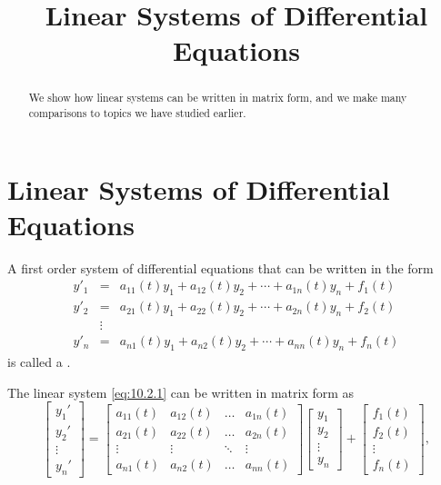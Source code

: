 \documentclass{ximera}
\title{Linear Systems of Differential Equations}%
\begin{document}
\begin{abstract}
We show how linear systems can be written in matrix form, and we make many comparisons to topics we have studied earlier.
\end{abstract}

\maketitle

\section*{Linear Systems of Differential Equations}

A  first order system of  differential equations that can be written in
the form
\begin{equation} \label{eq:10.2.1}
\begin{array}{ccl}
y'_1&=&a_{11}(t)y_1+a_{12}(t)y_2+\cdots+a_{1n}(t)y_n+f_1(t)\\
y'_2&=&a_{21}(t)y_1+a_{22}(t)y_2+\cdots+a_{2n}(t)y_n+f_2(t)\\
&\vdots\\
y'_n&
=&a_{n1}(t)y_1+a_{n2}(t)y_2+\cdots+a_{nn}(t)y_n+f_n(t)\end{array}
\end{equation}
is called a .

The linear system \eqref{eq:10.2.1}  can be written in matrix form as
$$
\begin{bmatrix}y_1'\\y_2'\\\vdots\\y_n'\end{bmatrix}=\begin{bmatrix}a_{11}(t)&a_{12}(t)&\dots &a_{1n}(t)\\
a_{21}(t)&a_{22}(t)&\dots &a_{2n}(t)\\
\vdots &\vdots &\ddots &\vdots\\
a_{n1}(t)&a_{n2}(t)&\dots &a_{nn}(t)\end{bmatrix}\begin{bmatrix}y_1\\y_2\\\vdots\\y_n\end{bmatrix}+\begin{bmatrix}f_1(t)\\f_2(t)\\\vdots\\f_n(t)\end{bmatrix},
$$
\end{document}
